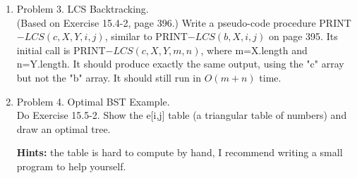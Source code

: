 \documentclass[11pt]{article}
\newtheorem{algorithm}{Algorithm}
\begin{document}
\begin{enumerate}
\begin{algorithm}
\begin{algorithmic}
        \end{algorithmic}
    \end{algorithm}
This runs in O(lg(m+n)) time because with each recursive call, one of the arrays gets reduced by half.\\
This reduces the space taken up, by a log factor

\pagebreak
\item Problem 3. LCS Backtracking.\\
(Based on Exercise 15.4-2, page 396.) Write a pseudo-code procedure PRINT$-LCS(c,X,Y,i,j)$, similar to PRINT$-LCS(b,X,i,j)$ on page 395. Its initial call is PRINT$-LCS(c,X,Y,m,n)$, where m=X.length and n=Y.length. It should produce exactly the same output, using the "c" array but not the "b" array. It should still run in $O(m+n)$ time.

\pagebreak
\item Problem 4. Optimal BST Example.\\
Do Exercise 15.5-2. Show the e[i,j] table (a triangular table of numbers) and draw an optimal tree.\vspace{0.1cm}

\textbf{Hints: }the table is hard to compute by hand, I recommend writing a small program to help yourself.



\end{enumerate}
\end{document}
